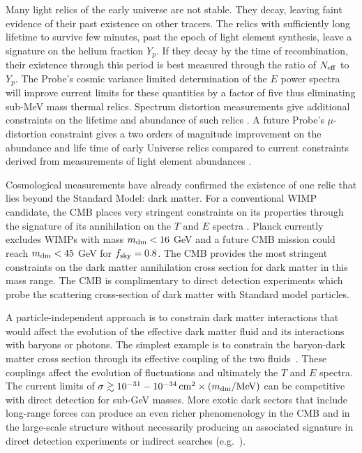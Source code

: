 Many light relics of the early universe are not stable. They decay, 
leaving faint evidence of their past existence on other tracers. The relics with sufficiently long lifetime to survive few minutes, 
past the epoch of light element synthesis, leave a signature on the helium fraction $Y_p$.  If they decay 
by the time of recombination, their existence through this period is best measured through the ratio of ${N_{\rm eff}}$ to $Y_p$. 
The Probe's cosmic variance limited determination 
of the $E$ power spectra will improve current limits for these quantities by
a factor of five thus eliminating sub-MeV mass thermal relics. 
%  
Spectrum distortion measurements give additional constraints on the lifetime and abundance 
of such relics \citep{Sarkar1984, Kawasaki1986, Hu1993b, Chluba2011therm}. A future Probe's $\mu$-distortion constraint gives a two orders of magnitude improvement on the abundance and life time of early Universe relics \cite{Chluba2013fore, Chluba2013PCA} compared to current constraints derived from measurements of light element abundances \cite{Kawasaki2005, Jedamzik2006}.

Cosmological measurements have already confirmed the existence of one relic that lies beyond the 
Standard Model: dark matter. For a conventional WIMP candidate, the CMB places very stringent 
constraints on its properties through the signature of its annihilation on the $T$ and $E$ 
spectra \citep{Peebles2000, Chen2004, Padmanabhan2005}.  Planck currently excludes WIMPs with mass $m_{\rm dm}< 16$ GeV and a future CMB mission could reach $m_{\rm dm} < 45$ GeV for $f_{\rm sky} =0.8$.  The CMB provides the most stringent constraints on the dark matter annihilation cross section for dark matter in this mass range.  The CMB is complimentary to direct detection experiments which probe the scattering cross-section of dark matter with Standard model particles.


A particle-independent approach is to constrain dark matter interactions that would 
affect the evolution of the effective dark matter fluid and its interactions with baryons or photons.  The simplest example is 
to constrain the baryon-dark matter cross section through its effective coupling of the two fluids~\cite{Dvorkin:2013cea}.  
These couplings affect the evolution of fluctuations and ultimately the $T$ and $E$ spectra. The current limits of $\sigma \gtrsim 10^{-31}-10^{-34}\,{\rm cm}^2 \times (m_{\rm dm} / {\rm MeV})$ can be competitive with direct detection for sub-GeV masses.  
More exotic dark sectors that include long-range forces can produce an even richer phenomenology in the CMB and in the large-scale structure 
without necessarily producing an associated signature in direct detection experiments or 
indirect searches (e.g.~\cite{Cyr-Racine:2013fsa,Buen-Abad:2015ova,Lesgourgues:2015wza}). 

